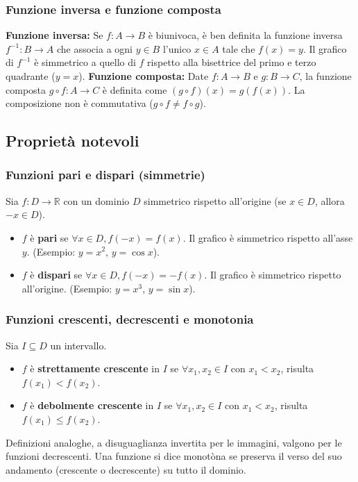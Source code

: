 \subsubsection{Funzione inversa e funzione composta}
\textbf{Funzione inversa:} Se $f: A \to B$ è biunivoca, è ben definita la funzione inversa $f^{-1}: B \to A$ che associa a ogni $y \in B$ l'unico $x \in A$ tale che $f(x) = y$. Il grafico di $f^{-1}$ è simmetrico a quello di $f$ rispetto alla bisettrice del primo e terzo quadrante ($y=x$).
\textbf{Funzione composta:} Date $f: A \to B$ e $g: B \to C$, la funzione composta $g \circ f: A \to C$ è definita come $(g \circ f)(x) = g(f(x))$. La composizione non è commutativa ($g \circ f \neq f \circ g$).

\subsection{Proprietà notevoli}
\subsubsection{Funzioni pari e dispari (simmetrie)}
Sia $f: D \to \mathbb{R}$ con un dominio $D$ simmetrico rispetto all'origine (se $x \in D$, allora $-x \in D$).
\begin{itemize}
    \item $f$ è \textbf{pari} se $\forall x \in D, f(-x) = f(x)$. Il grafico è simmetrico rispetto all'asse $y$. (Esempio: $y=x^2$, $y=\cos x$).
    \item $f$ è \textbf{dispari} se $\forall x \in D, f(-x) = -f(x)$. Il grafico è simmetrico rispetto all'origine. (Esempio: $y=x^3$, $y=\sin x$).
\end{itemize}

\subsubsection{Funzioni crescenti, decrescenti e monotonia}
Sia $I \subseteq D$ un intervallo.
\begin{itemize}
    \item $f$ è \textbf{strettamente crescente} in $I$ se $\forall x_1, x_2 \in I$ con $x_1 < x_2$, risulta $f(x_1) < f(x_2)$.
    \item $f$ è \textbf{debolmente crescente} in $I$ se $\forall x_1, x_2 \in I$ con $x_1 < x_2$, risulta $f(x_1) \le f(x_2)$.
\end{itemize}
Definizioni analoghe, a disuguaglianza invertita per le immagini, valgono per le funzioni decrescenti. Una funzione si dice monotòna se preserva il verso del suo andamento (crescente o decrescente) su tutto il dominio. 

